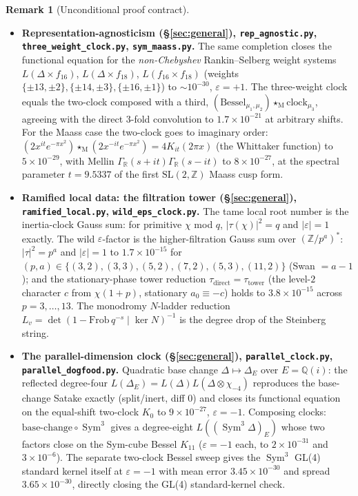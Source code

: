 \documentclass[11pt]{article}
\theoremstyle{definition}
\newtheorem{remark}[theorem]{Remark}
\newcommand{\Sym}{\operatorname{Sym}}
\begin{document}
\begin{remark}[Unconditional proof contract]
\begin{enumerate}
\begin{itemize}
\item \textbf{Representation-agnosticism (\S\ref{sec:general}), \texttt{rep\_agnostic.py},
\texttt{three\_weight\_clock.py}, \texttt{sym\_maass.py}.} The same completion closes the functional
equation for the \emph{non-Chebyshev} Rankin--Selberg weight systems $L(\Delta\times f_{16})$,
$L(\Delta\times f_{18})$, $L(f_{16}\times f_{18})$ (weights $\{\pm13,\pm2\},\{\pm14,\pm3\},\{\pm16,\pm1\}$)
to $\sim10^{-30}$, $\varepsilon=+1$. The three-weight clock equals the two-clock composed with a third,
$(\text{Bessel}_{\mu_1,\mu_2})\star_{\mathrm M}\text{clock}_{\mu_3}$, agreeing with the direct $3$-fold
convolution to $1.7\times10^{-21}$ at arbitrary shifts. For the Maass case the two-clock goes to
imaginary order: $(2x^{it}e^{-\pi x^2})\star_{\mathrm M}(2x^{-it}e^{-\pi x^2})=4K_{it}(2\pi x)$ (the
Whittaker function) to $5\times10^{-29}$, with Mellin $\Gamma_{\mathbb R}(s+it)\Gamma_{\mathbb R}(s-it)$
to $8\times10^{-27}$, at the spectral parameter $t=9.5337$ of the first $\mathrm{SL}(2,\mathbb Z)$ Maass
cusp form.

\item \textbf{Ramified local data: the filtration tower (\S\ref{sec:general}), \texttt{ramified\_local.py},
\texttt{wild\_eps\_clock.py}.} The tame local root number is the inertia-clock Gauss sum: for primitive
$\chi$ mod $q$, $|\tau(\chi)|^2=q$ and $|\varepsilon|=1$ exactly. The wild $\varepsilon$-factor is the
higher-filtration Gauss sum over $(\mathbb Z/p^a)^*$: $|\tau|^2=p^a$ and $|\varepsilon|=1$ to
$1.7\times10^{-15}$ for $(p,a)\in\{(3,2),(3,3),(5,2),(7,2),(5,3),(11,2)\}$ (Swan $=a-1$); and the
stationary-phase tower reduction $\tau_{\mathrm{direct}}=\tau_{\mathrm{tower}}$ (the level-$2$ character
$c$ from $\chi(1+p)$, stationary $a_0\equiv-c$) holds to $3.8\times10^{-15}$ across $p=3,\dots,13$. The
monodromy $N$-ladder reduction $L_v=\det(1-\mathrm{Frob}\,q^{-s}\mid\ker N)^{-1}$ is the degree drop of
the Steinberg string.

\item \textbf{The parallel-dimension clock (\S\ref{sec:general}), \texttt{parallel\_clock.py},
\texttt{parallel\_dogfood.py}.} Quadratic base change $\Delta\mapsto\Delta_E$ over $E=\mathbb Q(i)$: the
reflected degree-four $L(\Delta_E)=L(\Delta)L(\Delta\otimes\chi_{-4})$ reproduces the base-change Satake
exactly (split/inert, diff $0$) and closes its functional equation on the equal-shift two-clock $K_0$ to
$9\times10^{-27}$, $\varepsilon=-1$. Composing clocks: $\mathrm{base\text{-}change}\circ\Sym^3$ gives a
degree-eight $L((\Sym^3\Delta)_E)$ whose two factors close on the Sym-cube Bessel $K_{11}$ ($\varepsilon=-1$
each, to $2\times10^{-31}$ and $3\times10^{-6}$). The separate two-clock Bessel sweep gives the
$\Sym^3$ GL(4) standard kernel itself at $\varepsilon=-1$ with mean error $3.45\times10^{-30}$ and spread
$3.65\times10^{-30}$, directly closing the GL(4) standard-kernel check.


\end{itemize}
\end{enumerate}
\end{remark}
\end{document}
